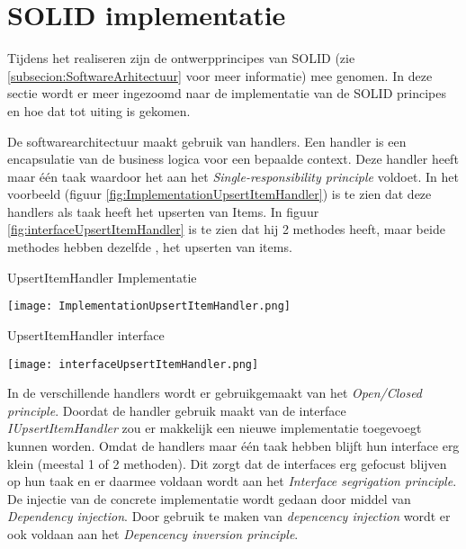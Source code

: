 \section{SOLID implementatie}
Tijdens het realiseren zijn de ontwerpprincipes van SOLID (zie \ref{subsecion:SoftwareArhitectuur} voor meer informatie) mee genomen.
In deze sectie wordt er meer ingezoomd naar de implementatie van de SOLID principes en hoe dat tot uiting is gekomen.

\whitespace
De softwarearchitectuur maakt gebruik van handlers.
Een handler is een encapsulatie van de business logica voor een bepaalde context.
Deze handler heeft maar één taak waardoor het aan het \textit{Single-responsibility principle} voldoet.
In het voorbeeld (figuur \ref{fig:ImplementationUpsertItemHandler}) is te zien dat deze handlers als taak heeft het upserten van Items.
In figuur \ref{fig:interfaceUpsertItemHandler} is te zien dat hij 2 methodes heeft, maar beide methodes hebben dezelfde , het upserten van items.

\whitespace
\begin{graphic}
    \captionsetup{type=figure}
    \caption{UpsertItemHandler Implementatie}
    \texttt{[image: ImplementationUpsertItemHandler.png]}
    \label{fig:ImplementationUpsertItemHandler}
\end{graphic}

\whitespace[2]
\begin{graphic}
    \captionsetup{type=figure}
    \caption{UpsertItemHandler interface}
    \texttt{[image: interfaceUpsertItemHandler.png]}
    \label{fig:interfaceUpsertItemHandler}
\end{graphic}

\whitespace
In de verschillende handlers wordt er gebruikgemaakt van het \textit{Open\slash Closed principle}.
Doordat de handler gebruik maakt van de interface \textit{IUpsertItemHandler} zou er makkelijk een nieuwe implementatie toegevoegt kunnen worden.
%
%
%
%
%
Omdat de handlers maar één taak hebben blijft hun interface erg klein (meestal 1 of 2 methoden).
Dit zorgt dat de interfaces erg gefocust blijven op hun taak en er daarmee voldaan wordt aan het \textit{Interface segrigation principle}.
De injectie van de concrete implementatie wordt gedaan door middel van \textit{Dependency injection}.
Door gebruik te maken van \textit{depencency injection} wordt er ook voldaan aan het \textit{Depencency inversion principle}.

